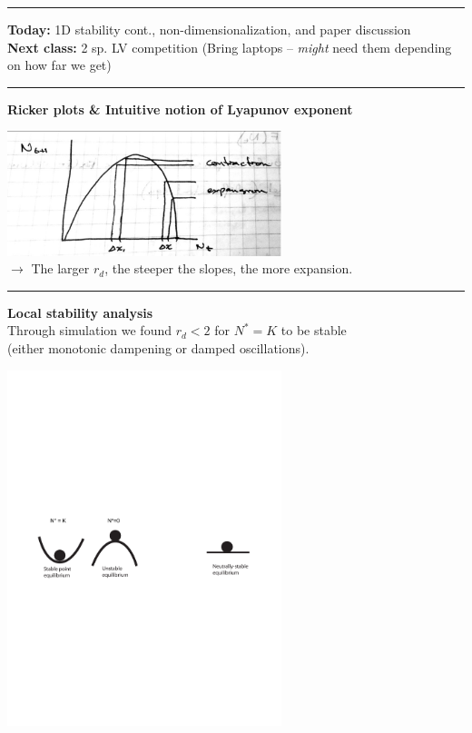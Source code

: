 \documentclass{article}
\newcommand{\ind}{\-\hspace{1cm}}
\begin{document}
\noindent{}
\rule[0.5ex]{\linewidth}{1pt}
\textbf{Today:} 1D stability cont., non-dimensionalization, and paper discussion\\
\textbf{Next class:} 2 sp. LV competition (Bring laptops -- \emph{might} need them depending on how far we get)\\
\rule[0.5ex]{\linewidth}{1pt}

\textbf{Ricker plots \& Intuitive notion of Lyapunov exponent}
\begin{center}
\includegraphics[width=8cm]{figs/RickerLyapunov.pdf}\\
$\to$ The larger $r_d$, the steeper the slopes, the more expansion.
\end{center}

\rule[0.5ex]{\linewidth}{1pt}

\textbf{Local stability analysis}\\
Through simulation we found $r_d<2$ for $N^*=K$ to be stable\\
\ind (either monotonic dampening or damped oscillations).
\begin{center}
\includegraphics[width=8cm]{figs/ballcup2.pdf}
\end{center}
\end{document}
